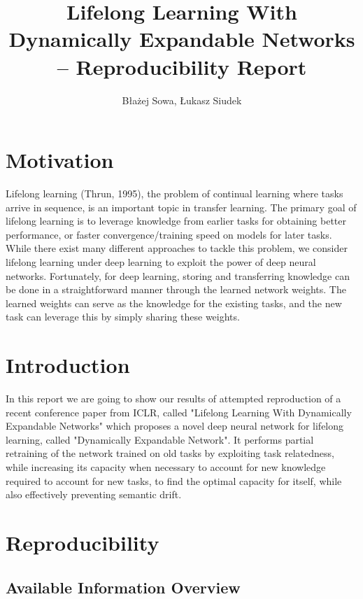 \documentclass[12pt]{article}
\title{Lifelong Learning With Dynamically Expandable Networks -- Reproducibility Report }
\author{Błażej Sowa, Łukasz Siudek}
\date{}
\begin{document}
    \maketitle
    
    \section {Motivation}
    
    Lifelong learning (Thrun, 1995), the problem of continual learning where tasks arrive in sequence, is
    an important topic in transfer learning. The primary goal of lifelong learning is to leverage knowledge
    from earlier tasks for obtaining better performance, or faster convergence/training speed on models
    for later tasks. While there exist many different approaches to tackle this problem, we consider
    lifelong learning under deep learning to exploit the power of deep neural networks. Fortunately, for
    deep learning, storing and transferring knowledge can be done in a straightforward manner through
    the learned network weights. The learned weights can serve as the knowledge for the existing tasks,
    and the new task can leverage this by simply sharing these weights.
    
    \section{Introduction}
    
    In this report we are going to show our results of attempted reproduction of a
    recent conference paper from ICLR, called "Lifelong Learning With Dynamically
    Expandable Networks" which proposes a novel deep neural network for lifelong learning, called "Dynamically
    Expandable Network". It performs partial retraining of the network trained on old tasks by exploiting task
    relatedness, while increasing its capacity when necessary to account for new knowledge required
    to account for new tasks, to find the optimal capacity for itself, while also effectively preventing
    semantic drift.
    
    \section {Reproducibility}
    
    \subsection {Available Information Overview}
    
\end{document}
